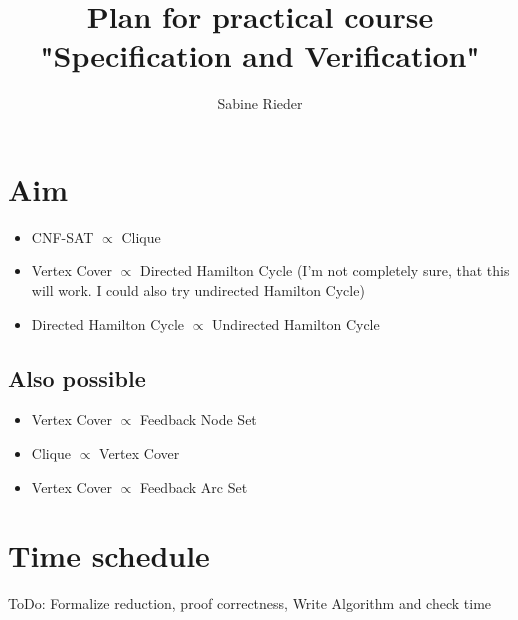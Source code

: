 \documentclass[11pt,a4paper]{scrartcl}
\author{Sabine Rieder}
\title{Plan for practical course "Specification and Verification"}
\date{}
\begin{document}
	\maketitle
	\section{Aim}
	\begin{itemize}
		\item CNF-SAT $\varpropto$ Clique
		\item Vertex Cover $\varpropto$ Directed Hamilton Cycle (I'm not completely sure, that this will work. I could also try undirected Hamilton Cycle)
		\item Directed Hamilton Cycle $\varpropto$ Undirected Hamilton Cycle
	\end{itemize}
	
	\subsection{Also possible}
	\begin{itemize}
		\item Vertex Cover $\varpropto$ Feedback Node Set
		\item Clique $\varpropto$ Vertex Cover
		\item Vertex Cover $\varpropto$ Feedback Arc Set
	\end{itemize}
	
	\section{Time schedule}
	ToDo: Formalize reduction, proof correctness, Write Algorithm and check time
	
\end{document}
